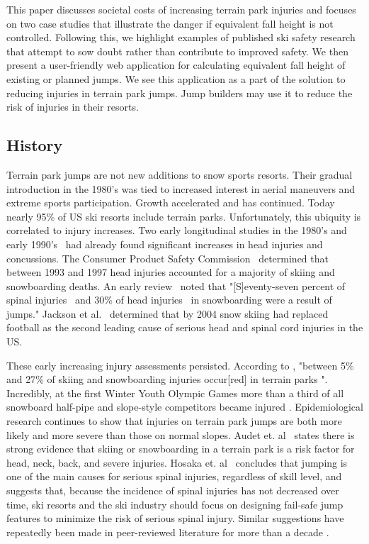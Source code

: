 \documentclass{article}
\begin{document}
This paper discusses societal costs of increasing terrain park injuries and
focuses on two case studies that illustrate the danger if equivalent fall
height is not controlled. Following this, we highlight examples of published
ski safety research that attempt to sow doubt rather than contribute to
improved safety. We then present a user-friendly web application for
calculating equivalent fall height of existing or planned jumps. We see this
application as a part of the solution to reducing injuries in terrain park
jumps. Jump builders may use it to reduce the risk of injuries in their
resorts.

\subsection{History}
%
Terrain park jumps are not new additions to snow sports resorts. Their gradual
introduction in the 1980's was tied to increased interest in aerial maneuvers
and extreme sports participation. Growth accelerated and has continued.  Today
nearly 95\% of US ski resorts include terrain parks. Unfortunately, this
ubiquity is correlated to injury increases.  Two early longitudinal studies  in
the 1980's and early 1990's~\cite{Deibert1998,Furrer1995} had already found
significant increases in head injuries and concussions. The Consumer Product
Safety Commission~\cite{CPSC1999} determined that between 1993 and 1997 head
injuries accounted for a majority of skiing and snowboarding deaths. An early
review~\cite{Koehle2002} noted that "[S]eventy-seven percent of spinal
injuries~\cite{Tarazi1999} and 30\% of head injuries~\cite{Fukuda2001} in
snowboarding were a result of jumps." Jackson et al.~\cite{Jackson2004}
determined that by 2004 snow skiing had replaced football as the second leading
cause of serious head and spinal cord injuries in the US.

These early increasing injury assessments persisted. According to
\cite{Russell2014}, "between 5\% and 27\% of skiing and snowboarding injuries
occur[red] in terrain parks \cite{Bridges2003, Goulet2007,Moffat2009,
Greve2009,Brooks2010,Ruedl2013}". Incredibly, at the first Winter Youth Olympic
Games more than a third of all snowboard half-pipe and slope-style competitors
became injured \cite{Ruedl2012}. Epidemiological research continues to show
\cite{Carus2016,Audet2019a,Hosaka2020} that injuries on terrain park jumps are
both more likely and more severe than those on normal slopes. Audet et.
al~\cite{Audet2019a} states  there is strong evidence that skiing or
snowboarding in a terrain park is a risk factor for head, neck, back, and
severe injuries. Hosaka et. al~\cite{Hosaka2020} concludes that jumping is one
of the main causes for serious spinal injuries, regardless of skill level, and
suggests that, because the incidence of spinal injuries has not decreased over
time, ski resorts and the ski industry should focus on designing fail-safe jump
features to minimize the risk of serious spinal injury.  Similar suggestions
have repeatedly been made in peer-reviewed literature for more than a decade
\cite{Hubbard2009,Swedberg2012,McNeil2012,McNeil2012a,Hubbard2015,
Levy2015,Petrone2017,Moore2018}.
\end{document}
